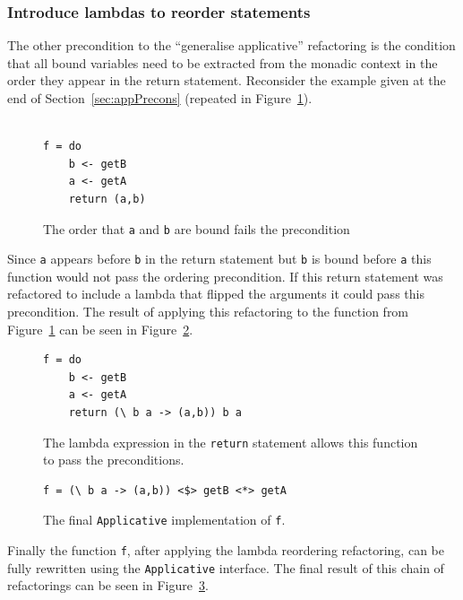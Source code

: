 \subsubsection{Introduce lambdas to reorder statements}
\label{lambdaIntro}

The other precondition to the ``generalise applicative'' refactoring is the condition that all bound variables need to be extracted from the monadic context in the order they appear in the return statement. Reconsider the example given at the end of Section~\ref{sec:appPrecons} (repeated in Figure~\ref{ordering}).

\begin{figure}[t]
\begin{lstlisting}

f = do
	b <- getB
	a <- getA
	return (a,b)
\end{lstlisting} 
\caption{The order that \texttt{a} and \texttt{b} are bound fails the precondition}
\label{ordering}
\end{figure}


Since \texttt{a} appears before \texttt{b} in the return statement but \texttt{b} is bound before \texttt{a} this function would not pass the ordering precondition. If this return statement was refactored to include a lambda that flipped the arguments it could pass this precondition. The result of applying this refactoring to the function from Figure~\ref{ordering} can be seen in Figure~\ref{reordered}.

\begin{figure}[t]
\begin{lstlisting}
f = do
	b <- getB
	a <- getA
	return (\ b a -> (a,b)) b a
\end{lstlisting}
\caption{The lambda expression in the \texttt{return} statement allows this function to pass the preconditions.}
\label{reordered}
\end{figure}

\begin{figure}[t]
\begin{lstlisting}
f = (\ b a -> (a,b)) <$> getB <*> getA
\end{lstlisting}
\caption{The final \texttt{Applicative} implementation of \texttt{f}.}
\label{finalF}
\end{figure}

Finally the function \texttt{f}, after applying the lambda reordering refactoring, can be fully rewritten using the \texttt{Applicative} interface. The final result of this chain of refactorings can be seen in Figure~\ref{finalF}.


